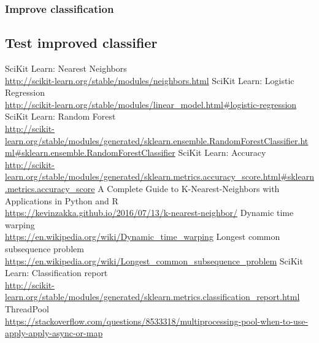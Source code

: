 \documentclass[12pt]{article}
\begin{document}
	\subsubsection{Improve classification}
	\subsection{Test improved classifier}
	
	\newpage
	\begin{thebibliography}{30}
		SciKit Learn: Nearest Neighbors \\
		 \url{http://scikit-learn.org/stable/modules/neighbors.html}
		  SciKit Learn: Logistic Regression \\
		 \url{http://scikit-learn.org/stable/modules/linear_model.html#logistic-regression}
		  SciKit Learn: Random Forest \\
		 \url{http://scikit-learn.org/stable/modules/generated/sklearn.ensemble.RandomForestClassifier.html#sklearn.ensemble.RandomForestClassifier}
		  SciKit Learn: Accuracy \\
		 \url{http://scikit-learn.org/stable/modules/generated/sklearn.metrics.accuracy_score.html#sklearn.metrics.accuracy_score}
		 A Complete Guide to K-Nearest-Neighbors with Applications in Python and R \\
		 \url{https://kevinzakka.github.io/2016/07/13/k-nearest-neighbor/}
		  Dynamic time warping \\
		 \url{https://en.wikipedia.org/wiki/Dynamic_time_warping}
		  Longest common subsequence problem \\
		 \url{https://en.wikipedia.org/wiki/Longest_common_subsequence_problem}
		  SciKit Learn: Classification report \\
		 \url{http://scikit-learn.org/stable/modules/generated/sklearn.metrics.classification_report.html}
		  ThreadPool \\
		 \url{https://stackoverflow.com/questions/8533318/multiprocessing-pool-when-to-use-apply-apply-async-or-map}
    \end{thebibliography}
	
\end{document}
